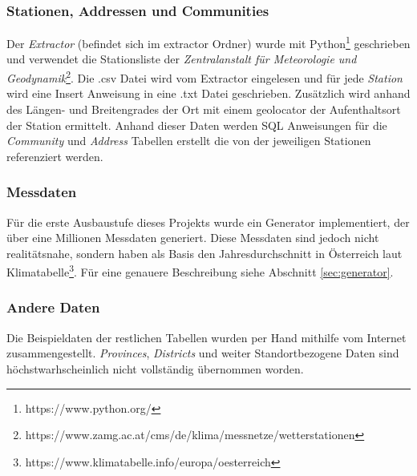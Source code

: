 \subsubsection{Stationen, Addressen und Communities}

Der \textit{Extractor} (befindet sich im extractor Ordner) wurde mit Python\footnote{https://www.python.org/} geschrieben und verwendet die Stationsliste der \textit{Zentralanstalt für Meteorologie und Geodynamik}\footnote{https://www.zamg.ac.at/cms/de/klima/messnetze/wetterstationen}. Die \grqq{}.csv\grqq{} Datei wird vom Extractor eingelesen und für jede \textit{Station} wird eine Insert Anweisung in eine \grqq{}.txt\grqq{} Datei geschrieben. Zusätzlich wird anhand des Längen- und Breitengrades der Ort mit einem geolocator der Aufenthaltsort der Station ermittelt. Anhand dieser Daten werden SQL Anweisungen für die \textit{Community} und \textit{Address} Tabellen erstellt die von der jeweiligen Stationen referenziert werden.

\subsubsection{Messdaten}
Für die erste Ausbaustufe dieses Projekts wurde ein Generator implementiert, der über eine Millionen Messdaten generiert. Diese Messdaten sind jedoch nicht realitätsnahe, sondern haben als Basis den Jahresdurchschnitt in Österreich laut Klimatabelle\footnote{https://www.klimatabelle.info/europa/oesterreich}.
Für eine genauere Beschreibung siehe Abschnitt \ref{sec:generator}.

\subsubsection{Andere Daten}
Die Beispieldaten der restlichen Tabellen wurden per Hand mithilfe vom Internet zusammengestellt. \textit{Provinces}, \textit{Districts} und weiter Standortbezogene Daten sind höchstwarhscheinlich nicht vollständig übernommen worden.